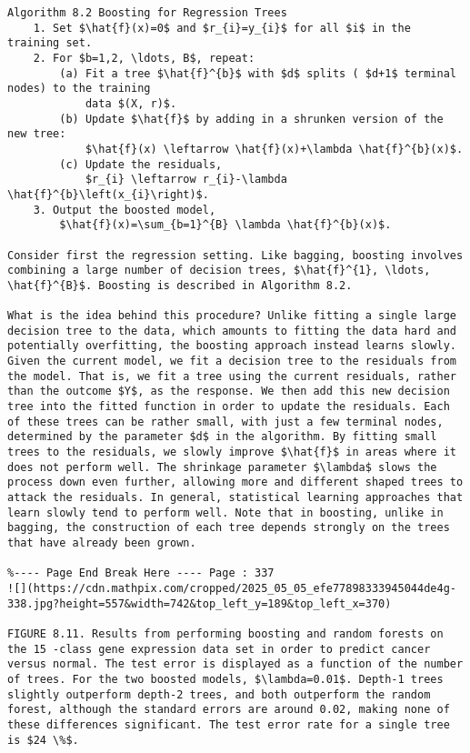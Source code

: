 \documentclass[10pt]{article}
\begin{document}
\begin{verbatim}
Algorithm 8.2 Boosting for Regression Trees
    1. Set $\hat{f}(x)=0$ and $r_{i}=y_{i}$ for all $i$ in the training set.
    2. For $b=1,2, \ldots, B$, repeat:
        (a) Fit a tree $\hat{f}^{b}$ with $d$ splits ( $d+1$ terminal nodes) to the training
            data $(X, r)$.
        (b) Update $\hat{f}$ by adding in a shrunken version of the new tree:
            $\hat{f}(x) \leftarrow \hat{f}(x)+\lambda \hat{f}^{b}(x)$.
        (c) Update the residuals,
            $r_{i} \leftarrow r_{i}-\lambda \hat{f}^{b}\left(x_{i}\right)$.
    3. Output the boosted model,
        $\hat{f}(x)=\sum_{b=1}^{B} \lambda \hat{f}^{b}(x)$.

Consider first the regression setting. Like bagging, boosting involves combining a large number of decision trees, $\hat{f}^{1}, \ldots, \hat{f}^{B}$. Boosting is described in Algorithm 8.2.

What is the idea behind this procedure? Unlike fitting a single large decision tree to the data, which amounts to fitting the data hard and potentially overfitting, the boosting approach instead learns slowly. Given the current model, we fit a decision tree to the residuals from the model. That is, we fit a tree using the current residuals, rather than the outcome $Y$, as the response. We then add this new decision tree into the fitted function in order to update the residuals. Each of these trees can be rather small, with just a few terminal nodes, determined by the parameter $d$ in the algorithm. By fitting small trees to the residuals, we slowly improve $\hat{f}$ in areas where it does not perform well. The shrinkage parameter $\lambda$ slows the process down even further, allowing more and different shaped trees to attack the residuals. In general, statistical learning approaches that learn slowly tend to perform well. Note that in boosting, unlike in bagging, the construction of each tree depends strongly on the trees that have already been grown.

%---- Page End Break Here ---- Page : 337
![](https://cdn.mathpix.com/cropped/2025_05_05_efe77898333945044de4g-338.jpg?height=557&width=742&top_left_y=189&top_left_x=370)

FIGURE 8.11. Results from performing boosting and random forests on the 15 -class gene expression data set in order to predict cancer versus normal. The test error is displayed as a function of the number of trees. For the two boosted models, $\lambda=0.01$. Depth-1 trees slightly outperform depth-2 trees, and both outperform the random forest, although the standard errors are around 0.02, making none of these differences significant. The test error rate for a single tree is $24 \%$.


\end{verbatim}
\end{document}
